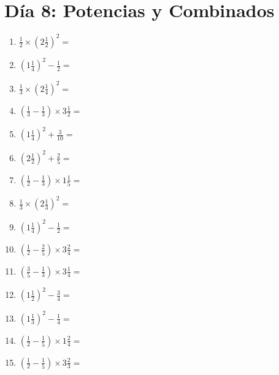 \documentclass[12pt]{article}
\begin{document}
\section*{Día 8: Potencias y Combinados}
\begin{enumerate}
\item \large $ \frac{1}{2} \times \left( 2 \frac{1}{2} \right)^2 = $ \vspace{1.6cm}
\item \large $ \left( 1 \frac{1}{4} \right)^2 - \frac{1}{2} = $ \vspace{1.6cm}
\item \large $ \frac{1}{3} \times \left( 2 \frac{1}{4} \right)^2 = $ \vspace{1.6cm}
\item \large $ \left( \frac{1}{3} - \frac{1}{3} \right) \times 3 \frac{1}{2} = $ \vspace{1.6cm}
\item \large $ \left( 1 \frac{1}{4} \right)^2 + \frac{3}{10} = $ \vspace{1.6cm}
\item \large $ \left( 2 \frac{1}{2} \right)^2 + \frac{2}{5} = $ \vspace{1.6cm}
\item \large $ \left( \frac{1}{2} - \frac{1}{3} \right) \times 1 \frac{1}{5} = $ \vspace{1.6cm}
\item \large $ \frac{1}{3} \times \left( 2 \frac{1}{3} \right)^2 = $ \vspace{1.6cm}
\item \large $ \left( 1 \frac{1}{4} \right)^2 - \frac{1}{2} = $ \vspace{1.6cm}
\item \large $ \left( \frac{1}{2} - \frac{2}{5} \right) \times 3 \frac{2}{4} = $ \vspace{1.6cm}
\newpage
\item \large $ \left( \frac{3}{5} - \frac{1}{3} \right) \times 3 \frac{1}{4} = $ \vspace{1.6cm}
\item \large $ \left( 1 \frac{1}{2} \right)^2 - \frac{3}{4} = $ \vspace{1.6cm}
\item \large $ \left( 1 \frac{1}{3} \right)^2 - \frac{1}{4} = $ \vspace{1.6cm}
\item \large $ \left( \frac{1}{2} - \frac{1}{5} \right) \times 1 \frac{2}{4} = $ \vspace{1.6cm}
\item \large $ \left( \frac{1}{2} - \frac{1}{5} \right) \times 3 \frac{2}{3} = $ \vspace{1.6cm}

\end{enumerate}
\end{document}
